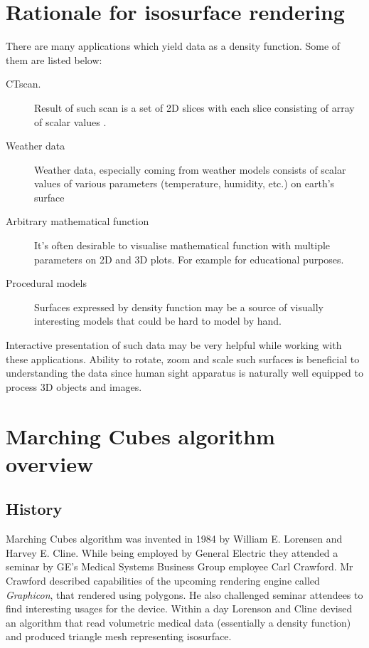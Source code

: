 \section{Rationale for isosurface rendering}

There are many applications which yield data as a density function. Some of them
are listed below:
\begin{description}
	\item[CT\footnotemark scan.]
		Result of such scan is a set of 2D slices with each slice
		consisting of array of scalar values \parencite{Lorensen:1987:MCH:37402.37422}.
	\item[Weather data]
		Weather data, especially coming from weather models consists of
		scalar values of various parameters (temperature, humidity, etc.)
		on earth's surface
	\item[Arbitrary mathematical function]
		It's often desirable to visualise mathematical function with
		multiple parameters on 2D and 3D plots. For example for
		educational purposes.
	\item[Procedural models]
		Surfaces expressed by density function may be a source of
		visually interesting models that could be hard to model by hand.
\end{description}

Interactive presentation of such data may be very helpful while working with
these applications. Ability to rotate, zoom and scale such surfaces is
beneficial to understanding the data since human sight apparatus is naturally
well equipped to process 3D objects and images.

\section{Marching Cubes algorithm overview}
\subsection{History \parencite{mchist}}
Marching Cubes algorithm was invented in 1984 by William E. Lorensen and Harvey
E. Cline. While being employed by General Electric they attended a seminar by
GE's Medical Systems Business Group employee Carl Crawford. Mr Crawford
described capabilities of the upcoming rendering engine called \emph{Graphicon},
that rendered using polygons. He also challenged seminar attendees to find
interesting usages for the device. Within a day Lorenson and Cline devised an
algorithm that read volumetric medical data (essentially a density function) and
produced triangle mesh representing isosurface.

